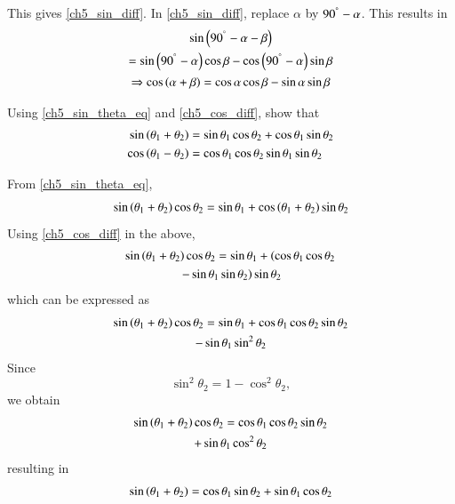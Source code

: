 %
This gives \eqref{ch5_sin_diff}.  In \eqref{ch5_sin_diff}, replace $\alpha$ by 
%
$90^{\degree} - \alpha$.  This results in
%
\begin{multline}
\sin\left(90^{\degree} - \alpha - \beta\right)
\\
=
\sin \left(90^{\degree} -\alpha\right) \cos \beta - \cos \left(90^{\degree} -\alpha\right) \sin \beta \\
\Rightarrow \cos\left(\alpha + \beta\right) = \cos \alpha \cos \beta - \sin \alpha \sin \beta
\end{multline}
% 
\begin{problem}
	Using \eqref{ch5_sin_theta_eq} and \eqref{ch5_cos_diff}, show that
\begin{align}
\label{ch5_sin_sum}
\sin\left(\theta_1 + \theta_2\right) &= \sin\theta_1  \cos\theta_2 + \cos\theta_1\sin\theta_2
\\
\cos\left(\theta_1 - \theta_2\right) &= \cos\theta_1  \cos\theta_2  \sin\theta_1\sin\theta_2
\label{ch5_cos_sum}
\end{align}
\end{problem}
%
\proof From \eqref{ch5_sin_theta_eq},
%
\begin{align}
 \sin \left(\theta_1 + \theta_2\right)\cos \theta_2 =\sin  \theta_1 +\cos\left(\theta_1+\theta_2\right)\sin\theta_2 
\end{align}
%
Using \eqref{ch5_cos_diff} in the above,
%
\begin{multline}
\sin \left(\theta_1 + \theta_2\right)\cos \theta_2 
=\sin  \theta_1 +\left(\cos \theta_1\cos\theta_2 \right.
\\	
\left.	- \sin \theta_1\sin\theta_2\right)\sin\theta_2 
\end{multline}
%
which can be expressed as
%
\begin{multline}
\sin \left(\theta_1 + \theta_2\right)\cos \theta_2 
=\sin  \theta_1 +\cos \theta_1\cos\theta_2 \sin\theta_2 
\\	
	- \sin \theta_1\sin^2\theta_2
\end{multline}
%
Since
%
\begin{equation}
\sin^2\theta_2 = 1- \cos^2\theta_2, 
\end{equation}
%
we obtain
%
\begin{multline}
\sin \left(\theta_1 + \theta_2\right)\cos \theta_2 
=\cos \theta_1\cos\theta_2 \sin\theta_2 
\\	
+ \sin \theta_1\cos^2\theta_2
\end{multline}
%
resulting in
%
\begin{equation}
\sin \left(\theta_1 + \theta_2\right)
=\cos \theta_1 \sin\theta_2 
+ \sin \theta_1\cos\theta_2
\end{equation}
